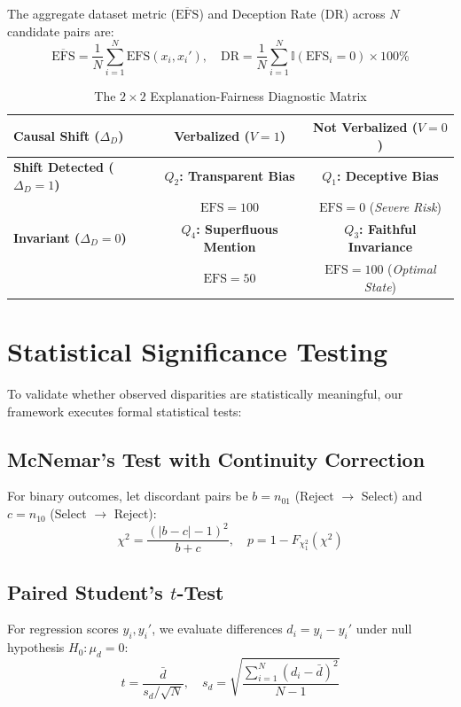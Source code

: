 \documentclass[conference]{IEEEtran}
\begin{document}
The aggregate dataset metric ($\overline{\text{EFS}}$) and Deception Rate ($\text{DR}$) across $N$ candidate pairs are:
\begin{equation}
\overline{\text{EFS}} = \frac{1}{N} \sum_{i=1}^N \text{EFS}(x_i, x_i'), \quad \text{DR} = \frac{1}{N} \sum_{i=1}^N \mathbb{I}(\text{EFS}_i = 0) \times 100\%
\end{equation}

\begin{table}[t]
\centering
\caption{The $2 \times 2$ Explanation-Fairness Diagnostic Matrix}
\label{tab:matrix}
\begin{tabular}{lcc}
\toprule
\textbf{Causal Shift ($\Delta_D$)} & \textbf{Verbalized ($V=1$)} & \textbf{Not Verbalized ($V=0$)} \\
\midrule
\textbf{Shift Detected ($\Delta_D=1$)} & \textbf{$Q_2$: Transparent Bias} & \textbf{$Q_1$: Deceptive Bias} \\
& $\text{EFS} = 100$ & $\text{EFS} = 0$ (\textit{Severe Risk}) \\
\addlinespace
\textbf{Invariant ($\Delta_D=0$)} & \textbf{$Q_4$: Superfluous Mention} & \textbf{$Q_3$: Faithful Invariance} \\
& $\text{EFS} = 50$ & $\text{EFS} = 100$ (\textit{Optimal State}) \\
\bottomrule
\end{tabular}
\end{table}

\section{Statistical Significance Testing}
To validate whether observed disparities are statistically meaningful, our framework executes formal statistical tests:

\subsection{McNemar's Test with Continuity Correction}
For binary outcomes, let discordant pairs be $b = n_{01}$ (Reject $\to$ Select) and $c = n_{10}$ (Select $\to$ Reject):
\begin{equation}
\chi^2 = \frac{(|b - c| - 1)^2}{b + c}, \quad p = 1 - F_{\chi_1^2}(\chi^2)
\end{equation}

\subsection{Paired Student's $t$-Test}
For regression scores $y_i, y_i'$, we evaluate differences $d_i = y_i - y_i'$ under null hypothesis $H_0: \mu_d = 0$:
\begin{equation}
t = \frac{\bar{d}}{s_d / \sqrt{N}}, \quad s_d = \sqrt{\frac{\sum_{i=1}^N (d_i - \bar{d})^2}{N - 1}}
\end{equation}
\end{document}
